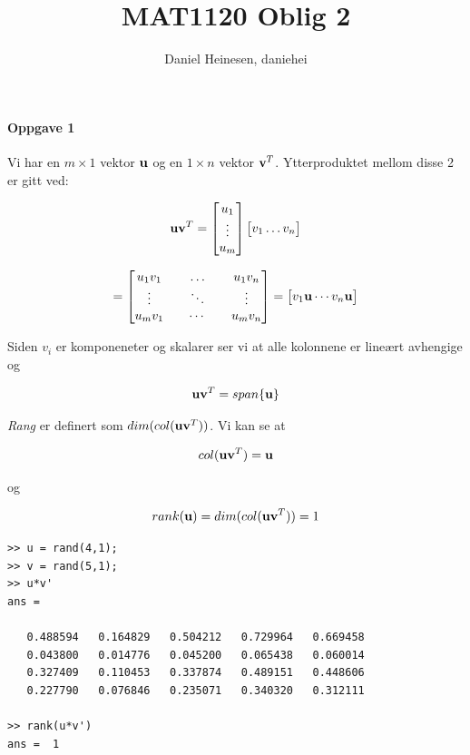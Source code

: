 \documentclass[a4paper,norsk, 10pt]{article}
\title{MAT1120 Oblig 2}
\author{Daniel Heinesen, daniehei}
\begin{document}
\maketitle

\paragraph*{Oppgave 1}

Vi har en $m \times 1$ vektor $\bold{u}$ og en $1 \times n$ vektor $\bold{v}^T$. Ytterproduktet mellom disse 2 er gitt ved:

$$
\bold{u}\bold{v}^T =
\begin{bmatrix}
 u_1\\
 \vdots \\
{u}_m 
\end{bmatrix}
\begin{bmatrix}
{v}_1
\ldots 
{v}_n 
\end{bmatrix}
$$ 

$$
=
\begin{bmatrix}
u_1 v_1 && \ldots && u_1 v_n \\
\vdots && \ddots && \vdots \\
u_mv_1 && \cdots && u_m v_n
\end{bmatrix}
=
\begin{bmatrix}
v_1\bold{u} \cdots v_n\bold{u}
\end{bmatrix} 
$$

Siden $v_i$ er komponeneter og skalarer ser vi at alle kolonnene er lineært avhengige og 

\begin{equation}
\bold{u}\bold{v}^T = span\{ \bold{u} \}
\end{equation}

\textit{Rang} er definert som $dim(col(\bold{u}\bold{v}^T))$. Vi kan se at 

$$
col(\bold{u}\bold{v}^T) = \bold{u}
$$

og 

\begin{equation}
rank(\bold{u}) = dim(col(\bold{u}\bold{v}^T)) = 1 
\end{equation}


\begin{verbatim}
>> u = rand(4,1);
>> v = rand(5,1);
>> u*v'
ans =

   0.488594   0.164829   0.504212   0.729964   0.669458
   0.043800   0.014776   0.045200   0.065438   0.060014
   0.327409   0.110453   0.337874   0.489151   0.448606
   0.227790   0.076846   0.235071   0.340320   0.312111

>> rank(u*v')
ans =  1
\end{verbatim}
\end{document}
